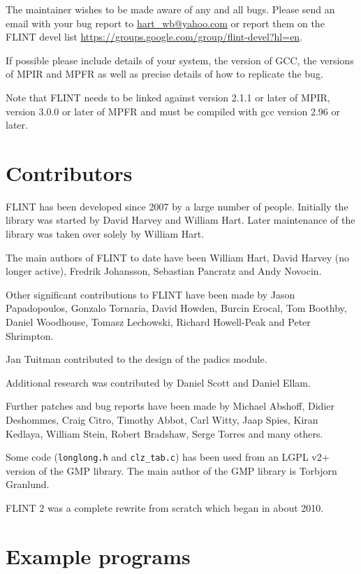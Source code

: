 \documentclass[a4paper,10pt]{book}
\newcommand{\code}{\lstinline}
\begin{document}
The maintainer wishes to be made aware of any and all bugs.  Please send an 
email with your bug report to \url{hart_wb@yahoo.com} or report them on the
FLINT devel list \url{https://groups.google.com/group/flint-devel?hl=en}.

If possible please include details of your system, the version of GCC, 
the versions of MPIR and MPFR as well as precise details of how to 
replicate the bug.

Note that FLINT needs to be linked against version 2.1.1 or later of MPIR,
version 3.0.0 or later of MPFR and must be compiled with gcc version 2.96 
or later.  

\chapter{Contributors}

FLINT has been developed since 2007 by a large number of people. Initially
the library was started by David Harvey and William Hart. Later maintenance
of the library was taken over solely by William Hart.

The main authors of FLINT to date have been William Hart, David Harvey (no
longer active), Fredrik Johansson, Sebastian Pancratz and Andy Novocin.

Other significant contributions to FLINT have been made by Jason Papadopoulos,
Gonzalo Tornaria, David Howden, Burcin Erocal, Tom Boothby, Daniel Woodhouse, 
Tomasz Lechowski, Richard Howell-Peak and Peter Shrimpton.

Jan Tuitman contributed to the design of the padics module.

Additional research was contributed by Daniel Scott and Daniel Ellam.

Further patches and bug reports have been made by Michael Abshoff, Didier 
Deshommes, Craig Citro, Timothy Abbot, Carl Witty, Jaap Spies, Kiran 
Kedlaya, William Stein, Robert Bradshaw, Serge Torres and many others.

Some code (\code{longlong.h} and \code{clz_tab.c}) has been used from
an LGPL v2+ version of the GMP library. The main author of the GMP 
library is Torbjorn Granlund.

FLINT 2 was a complete rewrite from scratch which began in about 2010.
 
\chapter{Example programs}
\end{document}
